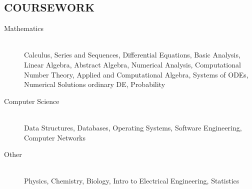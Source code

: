 \documentclass[margin]{res}
\begin{document}
\begin{resume}
\section{COURSEWORK}
    \begin{description}
                  \item[Mathematics] \hfill \\
                  Calculus, Series and Sequences, Differential Equations, Basic Analysis, Linear Algebra, Abstract Algebra, Numerical Analysis, Computational Number Theory, Applied and Computational Algebra, Systems of ODEs, Numerical Solutions ordinary DE, Probability
                  \item[Computer Science] \hfill \\
                  Data Structures, Databases, Operating Systems, Software Engineering, Computer Networks
                  \item[Other] \hfill \\
                  Physics, Chemistry, Biology, Intro to Electrical Engineering, Statistics
                \end{description}

\end{resume}
\end{document}
